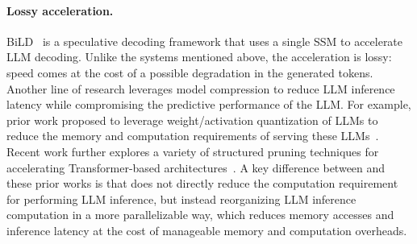 

\paragraph{Lossy acceleration.}
BiLD~\cite{biglittletransformer} is a speculative decoding framework that uses a single SSM to accelerate LLM decoding. Unlike the systems mentioned above, the acceleration is lossy: speed comes at the cost of a possible degradation in the generated tokens. 
Another line of research leverages model compression to reduce LLM inference latency while compromising the predictive performance of the LLM.
For example, prior work proposed to leverage weight/activation quantization of LLMs to reduce the memory and computation requirements of serving these LLMs~\cite{xiao2022smoothquant, frantar2023gptq, park2022nuqmm, yao2022zeroquant,dettmers2022gpt3}.
Recent work further explores a variety of structured pruning techniques for accelerating Transformer-based architectures~\cite{frantar2023sparsegpt, wang2021spatten, hubara2021accelerated}.
A key difference between \Sys and these prior works is that \Sys does not directly reduce the computation requirement for performing LLM inference, but instead reorganizing LLM inference computation in a more parallelizable way, which reduces memory accesses and inference latency at the cost of manageable memory and computation overheads.

